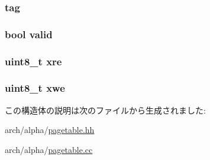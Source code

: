 \label{structAlphaISA_1_1TlbEntry_ac015791e15ce4dda4e015f8da6a1f910}
\hypertarget{structAlphaISA_1_1TlbEntry_a37fe97093e3df5a68f35c18538628836}{
\subsubsection[{tag}]{ {\bf tag}}}
\label{structAlphaISA_1_1TlbEntry_a37fe97093e3df5a68f35c18538628836}
\hypertarget{structAlphaISA_1_1TlbEntry_a28e3c179a86f337095088b3ca02a2b2a}{
\subsubsection[{valid}]{\setlength{\rightskip}{0pt plus 5cm}bool {\bf valid}}}
\label{structAlphaISA_1_1TlbEntry_a28e3c179a86f337095088b3ca02a2b2a}
\hypertarget{structAlphaISA_1_1TlbEntry_adffc88fa4f56bc343e0b278168618a61}{
\subsubsection[{xre}]{\setlength{\rightskip}{0pt plus 5cm}uint8\_\-t {\bf xre}}}
\label{structAlphaISA_1_1TlbEntry_adffc88fa4f56bc343e0b278168618a61}
\hypertarget{structAlphaISA_1_1TlbEntry_a6e9e8d2fb06547035ddbbff85a8f5212}{
\subsubsection[{xwe}]{\setlength{\rightskip}{0pt plus 5cm}uint8\_\-t {\bf xwe}}}
\label{structAlphaISA_1_1TlbEntry_a6e9e8d2fb06547035ddbbff85a8f5212}


この構造体の説明は次のファイルから生成されました:\begin{DoxyCompactItemize}
\item 
arch/alpha/\hyperlink{alpha_2pagetable_8hh}{pagetable.hh}\item 
arch/alpha/\hyperlink{alpha_2pagetable_8cc}{pagetable.cc}\end{DoxyCompactItemize}
